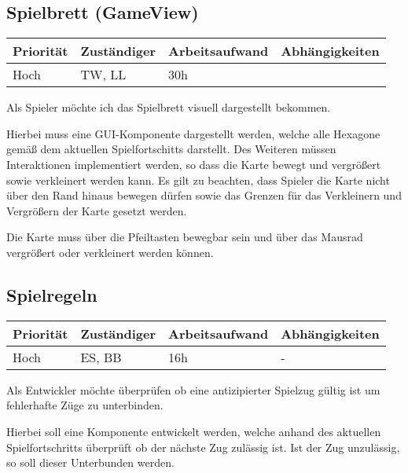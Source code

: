 \documentclass[a4paper]{scrreprt}
\newenvironment{requirement}[5] {
	\subsection{#1}
	\begin{tabularx}{\textwidth}{|X|l|X|X|}
		\hline
		Priorität & Zuständiger & Arbeitsaufwand & Abhängigkeiten \\
		\hline
		#2 & #3 & #4 & #5 \\
		\hline
	\end{tabularx}
	}{
	\newpage
	}
\begin{document}
\begin{requirement}{Spielbrett (GameView)}{Hoch}{TW, LL}{30h}{}
	
\begin{center}
	Als Spieler möchte ich das Spielbrett visuell dargestellt bekommen.
\end{center}

Hierbei muss eine GUI-Komponente dargestellt werden, welche alle Hexagone gemäß dem aktuellen Spielfortschitts darstellt. Des Weiteren müssen Interaktionen implementiert werden,
so dass die Karte bewegt und vergrößert sowie verkleinert werden kann. Es gilt zu beachten, dass Spieler die Karte nicht über den Rand hinaus bewegen dürfen sowie das Grenzen für das Verkleinern und Vergrößern der Karte gesetzt werden.

Die Karte muss über die Pfeiltasten bewegbar sein und über das Mausrad vergrößert oder verkleinert werden können.

\end{requirement}


\begin{requirement}{Spielregeln}{Hoch}{ES, BB}{16h}{-}

\begin{center}
	Als Entwickler möchte überprüfen ob eine antizipierter Spielzug gültig ist um fehlerhafte Züge zu unterbinden.
\end{center}

Hierbei soll eine Komponente entwickelt werden, welche anhand des aktuellen Spielfortschritts überprüft ob der nächste Zug zulässig ist.
Ist der Zug unzulässig, so soll dieser Unterbunden werden.

\end{requirement}
\end{document}
